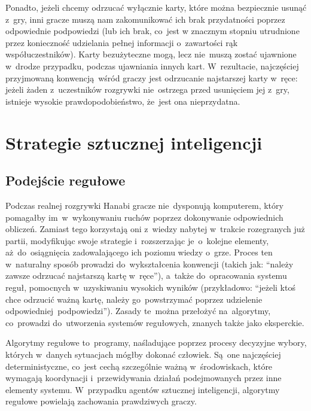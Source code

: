 \documentclass[declaration,shortabstract,inz]{iithesis}
\begin{document}
Ponadto, jeżeli chcemy odrzucać wyłącznie karty, które można bezpiecznie usunąć z~gry, inni gracze muszą nam zakomunikować ich brak przydatności poprzez odpowiednie podpowiedzi (lub ich brak, co~jest w znacznym stopniu utrudnione przez konieczność udzielania pełnej informacji o~zawartości rąk współuczestników). Karty bezużyteczne mogą, lecz nie~muszą zostać ujawnione w~drodze przypadku, podczas ujawniania innych kart. W~rezultacie, najczęściej przyjmowaną konwencją wśród graczy jest odrzucanie najstarszej karty w~ręce: jeżeli żaden z~uczestników rozgrywki nie~ostrzega przed usunięciem jej z~gry, istnieje wysokie prawdopodobieństwo, że~jest ona nieprzydatna.

\chapter{Strategie sztucznej inteligencji}

\section{Podejście regułowe}

Podczas realnej rozgrywki Hanabi gracze nie~dysponują komputerem, który pomagałby im~w~wykonywaniu ruchów poprzez dokonywanie odpowiednich obliczeń. Zamiast tego korzystają oni z~wiedzy nabytej w~trakcie rozegranych już partii, modyfikując swoje strategie i~rozszerzając je~o~kolejne elementy, aż~do~osiągnięcia zadowalającego ich poziomu wiedzy o~grze. Proces ten w~naturalny sposób prowadzi do~wykształcenia konwencji (takich jak: ``należy zawsze odrzucać najstarszą kartę w~ręce''), a~także do~opracowania systemu reguł, pomocnych w~uzyskiwaniu wysokich wyników (przykładowo: ``jeżeli ktoś chce odrzucić ważną kartę, należy go~powstrzymać poprzez udzielenie odpowiedniej podpowiedzi''). Zasady te~można przełożyć na~algorytmy, co~prowadzi do~utworzenia systemów regułowych, znanych także jako eksperckie.

Algorytmy regułowe to~programy, naśladujące poprzez procesy decyzyjne wybory, których w~danych sytuacjach mógłby dokonać człowiek. Są~one najczęściej deterministyczne, co~jest cechą szczególnie ważną w~środowiskach, które wymagają koordynacji i~przewidywania działań podejmowanych przez inne elementy systemu. W~przypadku agentów sztucznej inteligencji, algorytmy regułowe powielają zachowania prawdziwych graczy.
\end{document}
